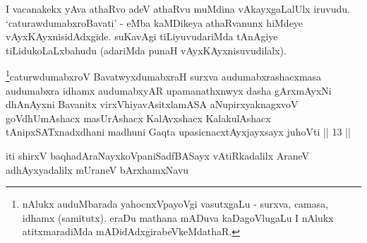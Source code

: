 \begin{artha}
I vacanakekx yAva athaRvo adeV athaRvu muMdina vAkayxgaLalUlx iruvudu. 
`caturawdumabxroBavati' - eMba kaMDikeya athaRvanunx hiMdeye 
vAyxKAyxnisidAdxgide. suKavAgi tiLiyuvudariMda tAnAgiye 
tiLidukoLaLxbahudu (adariMda punaH vAyxKAyxnisuvudilalx).
\end{artha}

\begin{kandikeshl}
\footnote{nAlukx auduMbarada yahocnxVpayoVgi vasutxgaLu - surxva, 
camasa, idhamx (samitutx). eraDu mathana mADuva kaDagoVlugaLu I nAlukx 
atitxmaradiMda mADidAdxgirabeVkeMdathaR.}caturwdumabxroV BavatwyxdumabxraH surxva audumabxrashacxmasa audumabxra idhamx audumabxyAR upamanathxnwyx dasha gArxmAyxNi dhAnAyxni Bavanitx virxVhiyavAsitxlamASA aNupirxyaknagxvoV goVdhUmAshacx masUrAshacx KalAvxshacx KalakulAshacx tAnipxSATxnadxdhani madhuni Gaqta upasicnacxtAyxjayxsayx juhoVti || 13 ||
\end{kandikeshl}

\begin{center}
iti shirxV baqhadAraNayxkoVpaniSadfBASayx vAtiRkadalilx AraneV 
adhAyxyadalilx mUraneV bArxhamxNavu
\end{center}
